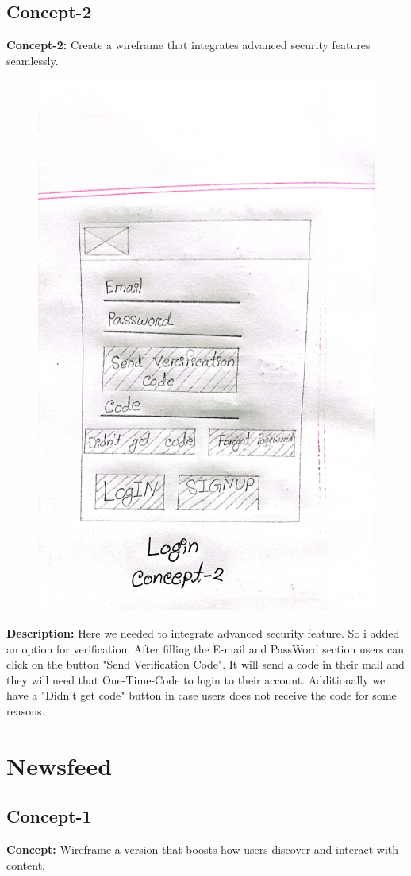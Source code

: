 \documentclass{report}
\begin{document}
\subsection{Concept-2}
\textbf{Concept-2: }Create a wireframe that integrates advanced security features seamlessly.

\begin{figure}[h]
    \centering
    \includegraphics[width=0.5\linewidth]{2.jpg}
    \label{fig:enter-label}
\end{figure}


\textbf{Description: } Here we needed to integrate advanced security feature. So i added an option for verification. After filling the E-mail and PassWord section users can click on the button "Send Verification Code". It will send a code in their mail and they will need that One-Time-Code to login to their account. Additionally we have a "Didn't get code" button in case users does not receive the code for some reasons.


\newpage



\section{Newsfeed}
\subsection{Concept-1}
\textbf{Concept: }Wireframe a version that boosts how users discover and interact with content.
\end{document}
